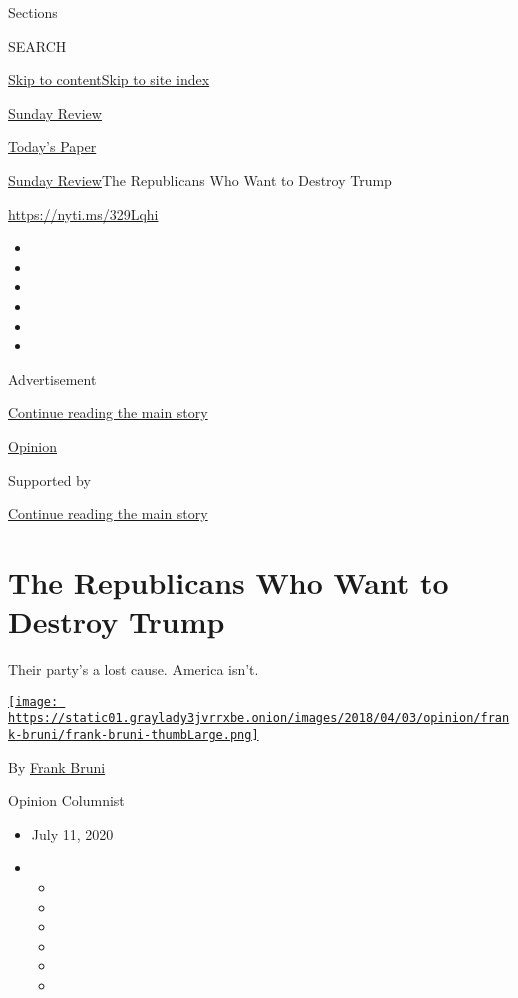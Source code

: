 Sections

SEARCH

\protect\hyperlink{site-content}{Skip to
content}\protect\hyperlink{site-index}{Skip to site index}

\href{https://www.nytimes3xbfgragh.onion/section/opinion/sunday}{Sunday
Review}

\href{https://myaccount.nytimes3xbfgragh.onion/auth/login?response_type=cookie\&client_id=vi}{}

\href{https://www.nytimes3xbfgragh.onion/section/todayspaper}{Today's
Paper}

\href{/section/opinion/sunday}{Sunday Review}\textbar{}The Republicans
Who Want to Destroy Trump

\href{https://nyti.ms/329Lqhi}{https://nyti.ms/329Lqhi}

\begin{itemize}
\item
\item
\item
\item
\item
\item
\end{itemize}

Advertisement

\protect\hyperlink{after-top}{Continue reading the main story}

\href{/section/opinion}{Opinion}

Supported by

\protect\hyperlink{after-sponsor}{Continue reading the main story}

\hypertarget{the-republicans-who-want-to-destroy-trump}{%
\section{The Republicans Who Want to Destroy
Trump}\label{the-republicans-who-want-to-destroy-trump}}

Their party's a lost cause. America isn't.

\href{https://www.nytimes3xbfgragh.onion/by/frank-bruni}{\texttt{[image: https://static01.graylady3jvrrxbe.onion/images/2018/04/03/opinion/frank-bruni/frank-bruni-thumbLarge.png]}}

By \href{https://www.nytimes3xbfgragh.onion/by/frank-bruni}{Frank Bruni}

Opinion Columnist

\begin{itemize}
\item
  July 11, 2020
\item
  \begin{itemize}
  \item
  \item
  \item
  \item
  \item
  \item
  \end{itemize}
\end{itemize}


